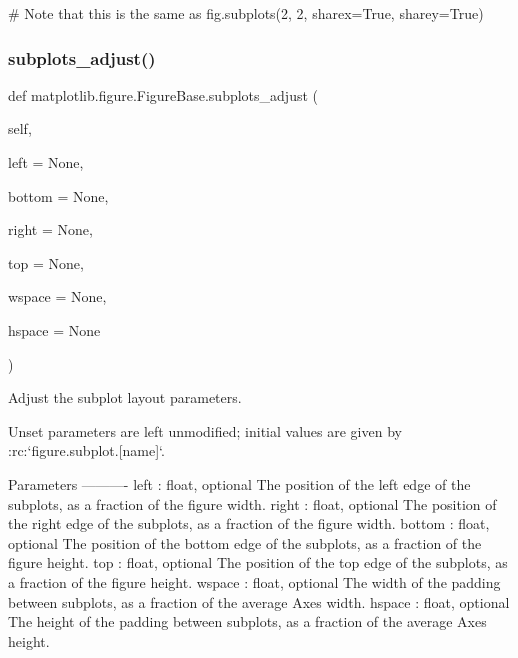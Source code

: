 \begin{DoxyVerb}
\begin{DoxyVerb}
\begin{DoxyVerb}
    # Note that this is the same as
    fig.subplots(2, 2, sharex=True, sharey=True)
\end{DoxyVerb}
 \mbox{\label{classmatplotlib_1_1figure_1_1FigureBase_a6c53e6b3d14d9b6bc795a9459f7ba956}} 
\subsubsection{\texorpdfstring{subplots\+\_\+adjust()}{subplots\_adjust()}}
{\footnotesize\ttfamily def matplotlib.\+figure.\+Figure\+Base.\+subplots\+\_\+adjust (\begin{DoxyParamCaption}\item[{}]{self,  }\item[{}]{left = {\ttfamily None},  }\item[{}]{bottom = {\ttfamily None},  }\item[{}]{right = {\ttfamily None},  }\item[{}]{top = {\ttfamily None},  }\item[{}]{wspace = {\ttfamily None},  }\item[{}]{hspace = {\ttfamily None} }\end{DoxyParamCaption})}

\begin{DoxyVerb}Adjust the subplot layout parameters.

Unset parameters are left unmodified; initial values are given by
:rc:`figure.subplot.[name]`.

Parameters
----------
left : float, optional
    The position of the left edge of the subplots,
    as a fraction of the figure width.
right : float, optional
    The position of the right edge of the subplots,
    as a fraction of the figure width.
bottom : float, optional
    The position of the bottom edge of the subplots,
    as a fraction of the figure height.
top : float, optional
    The position of the top edge of the subplots,
    as a fraction of the figure height.
wspace : float, optional
    The width of the padding between subplots,
    as a fraction of the average Axes width.
hspace : float, optional
    The height of the padding between subplots,
    as a fraction of the average Axes height.
\end{DoxyVerb}
 \mbox{\label{classmatplotlib_1_1figure_1_1FigureBase_a863f7a43e8be9dffccc3e687c62e6b71}} 

\end{DoxyVerb}
\end{DoxyVerb}
